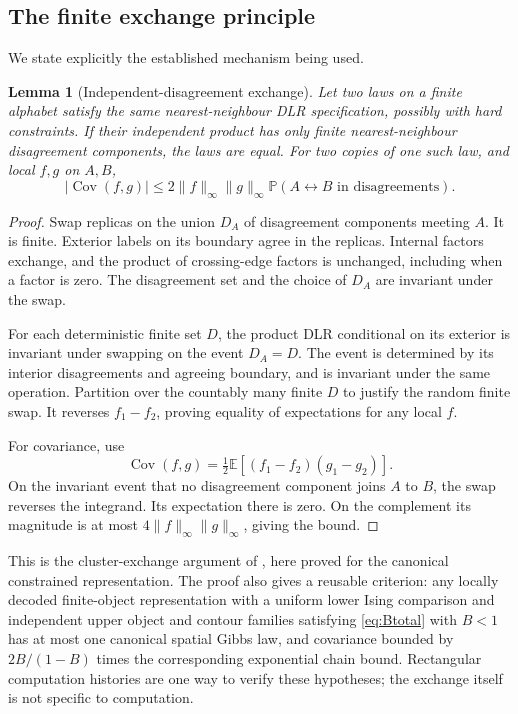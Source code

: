 \documentclass[11pt,reqno]{amsart}
\numberwithin{equation}{section}
\newtheorem{lemma}[theorem]{Lemma}
\theoremstyle{definition}
\theoremstyle{remark}
\newcommand{\E}{\mathbb E}
\newcommand{\Prob}{\mathbb P}
\newcommand{\Cov}{\operatorname{Cov}}
\newcommand{\norm}[1]{\lVert#1\rVert}
\begin{document}
\subsection{The finite exchange principle}
We state explicitly the established mechanism being used.
\begin{lemma}[Independent-disagreement exchange]\label{lem:swap}
Let two laws on a finite alphabet satisfy the same nearest-neighbour DLR specification, possibly with hard constraints. If their independent product has only finite nearest-neighbour disagreement components, the laws are equal. For two copies of one such law, and local $f,g$ on $A,B$,
\[
 |\Cov(f,g)|\leq2\norm f_\infty\norm g_\infty
 \Prob(A\leftrightarrow B\text{ in disagreements}).
\]
\end{lemma}
\begin{proof}
Swap replicas on the union $D_A$ of disagreement components meeting $A$. It is finite. Exterior labels on its boundary agree in the replicas. Internal factors exchange, and the product of crossing-edge factors is unchanged, including when a factor is zero. The disagreement set and the choice of $D_A$ are invariant under the swap.

For each deterministic finite set $D$, the product DLR conditional on its exterior is invariant under swapping on the event $D_A=D$. The event is determined by its interior disagreements and agreeing boundary, and is invariant under the same operation. Partition over the countably many finite $D$ to justify the random finite swap. It reverses $f_1-f_2$, proving equality of expectations for any local $f$.

For covariance, use
\[
 \Cov(f,g)=\tfrac12\E[(f_1-f_2)(g_1-g_2)].
\]
On the invariant event that no disagreement component joins $A$ to $B$, the swap reverses the integrand. Its expectation there is zero. On the complement its magnitude is at most $4\norm f_\infty\norm g_\infty$, giving the bound.
\end{proof}

This is the cluster-exchange argument of \cite{VanDenBerg1993}, here proved for the canonical constrained representation. The proof also gives a reusable criterion: any locally decoded finite-object representation with a uniform lower Ising comparison and independent upper object and contour families satisfying \eqref{eq:Btotal} with $B<1$ has at most one canonical spatial Gibbs law, and covariance bounded by $2B/(1-B)$ times the corresponding exponential chain bound. Rectangular computation histories are one way to verify these hypotheses; the exchange itself is not specific to computation.
\end{document}
